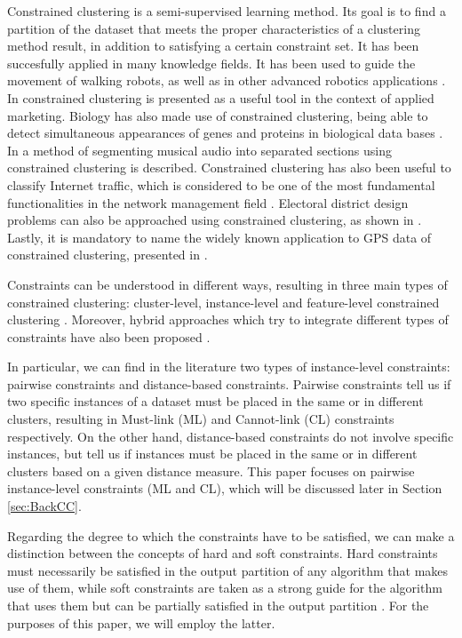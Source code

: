 \documentclass[review]{elsarticle}
\begin{document}
Constrained clustering is a semi-supervised learning method. Its goal is to find a partition of the dataset that meets the proper characteristics of a clustering method result, in addition to satisfying a certain constraint set. It has been succesfully applied in many knowledge fields. It has been used to guide the movement of walking robots, as well as in other advanced robotics applications \cite{davidson2005clustering, semnani2016constrained}. In \cite{seret2014new} constrained clustering is presented as a useful tool in the context of applied marketing. Biology has also made use of constrained clustering, being able to detect simultaneous appearances of genes and proteins in biological data bases \cite{segal2003discovering}. In \cite{levy2008structural} a method of segmenting musical audio into separated sections using constrained clustering is described. Constrained clustering has also been useful to classify Internet traffic, which is considered to be one of the most fundamental functionalities in the network management field \cite{wang2014internet}. Electoral district design problems can also be approached using constrained clustering, as shown in \cite{brieden2017constrained}. Lastly, it is mandatory to name the widely known application to GPS data of constrained clustering, presented in \cite{wagstaff2001constrained}.

Constraints can be understood in different ways, resulting in three main types of constrained clustering: cluster-level, instance-level and feature-level constrained clustering \cite{bradley2000constrained,davidson2007survey,schmidt2011clustering}. Moreover, hybrid approaches which try to integrate different types of constraints have also been proposed \cite{wang2010clustering}. 

In particular, we can find in the literature two types of instance-level constraints: pairwise constraints and distance-based constraints. Pairwise constraints tell us if two specific instances of a dataset must be placed in the same or in different clusters, resulting in Must-link (ML) and Cannot-link (CL) constraints respectively. On the other hand, distance-based constraints do not involve specific instances, but tell us if instances must be placed in the same or in different clusters based on a given distance measure.\cite{davidson2007survey} This paper focuses on pairwise instance-level constraints (ML and CL), which will be discussed later in Section \ref{sec:BackCC}.

Regarding the degree to which the constraints have to be satisfied, we can make a distinction between the concepts of hard and soft constraints. Hard constraints must necessarily be satisfied in the output partition of any algorithm that makes use of them, while soft constraints are taken as a strong guide for the algorithm that uses them but can be partially satisfied in the output partition \cite{seret2014new, wagstaff2001constrained, law2004clustering}. For the purposes of this paper, we will employ the latter.
\end{document}
